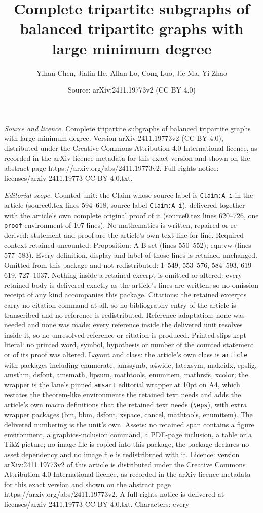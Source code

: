 \documentclass[10pt,a4paper]{amsart}
\title[Complete tripartite subgraphs of balanced tripartite graphs ]{Complete tripartite subgraphs of balanced tripartite graphs with large minimum degree}
\author{Yihan Chen, Jialin He, Allan Lo, Cong Luo, Jie Ma, Yi Zhao}
\date{Source: arXiv:2411.19773v2 (CC BY 4.0)}
\begin{document}
\maketitle

\noindent\emph{Source and licence.} Complete tripartite subgraphs of balanced tripartite graphs with large minimum degree. Version arXiv:2411.19773v2 (CC BY 4.0), distributed under the Creative Commons Attribution 4.0 International licence, as recorded in the arXiv licence metadata for this exact version and shown on the abstract page https://arxiv.org/abs/2411.19773v2. Full rights notice: licenses/arxiv-2411.19773-CC-BY-4.0.txt.\par\smallskip

\noindent\textit{Editorial scope.} Counted unit: the Claim whose source label is \texttt{Claim:A\_i} in the article (source0.tex lines 594--618, source label \texttt{Claim:A\_i}), delivered together with the article's own complete original proof of it (source0.tex lines 620--726, one \texttt{proof} environment of 107 lines). No mathematics is written, repaired or re-derived: statement and proof are the article's own text line for line. Required context retained uncounted: Proposition: A-B set (lines 550--552); eqn:vw (lines 577--583). Every definition, display and label of those lines is retained unchanged. Omitted from this package and not redistributed: 1--549, 553--576, 584--593, 619--619, 727--1037. Nothing inside a retained excerpt is omitted or altered: every retained body is delivered exactly as the article's lines are written, so no omission receipt of any kind accompanies this package. Citations: the retained excerpts carry no citation command at all, so no bibliography entry of the article is transcribed and no reference is redistributed. Reference adaptation: none was needed and none was made; every reference inside the delivered unit resolves inside it, so no unresolved reference or citation is produced. Printed slips kept literal: no printed word, symbol, hypothesis or number of the counted statement or of its proof was altered. Layout and class: the article's own class is \texttt{article} with packages including enumerate, amssymb, a4wide, latexsym, makeidx, epsfig, amsthm, dsfont, amsmath, lipsum, mathtools, enumitem, mathrsfs, xcolor; the wrapper is the lane's pinned \texttt{amsart} editorial wrapper at 10pt on A4, which restates the theorem-like environments the retained text needs and adds the article's own macro definitions that the retained text needs (\texttt{\textbackslash eps}), with extra wrapper packages (bm, bbm, dsfont, xspace, cancel, mathtools, enumitem). The delivered numbering is the unit's own. Assets: no retained span contains a figure environment, a graphics-inclusion command, a PDF-page inclusion, a table or a TikZ picture; no image file is copied into this package, the package declares no asset dependency and no image file is redistributed with it. Licence: version arXiv:2411.19773v2 of this article is distributed under the Creative Commons Attribution 4.0 International licence, as recorded in the arXiv licence metadata for this exact version and shown on the abstract page https://arxiv.org/abs/2411.19773v2. A full rights notice is delivered at licenses/arxiv-2411.19773-CC-BY-4.0.txt. Characters: every 
\end{document}
